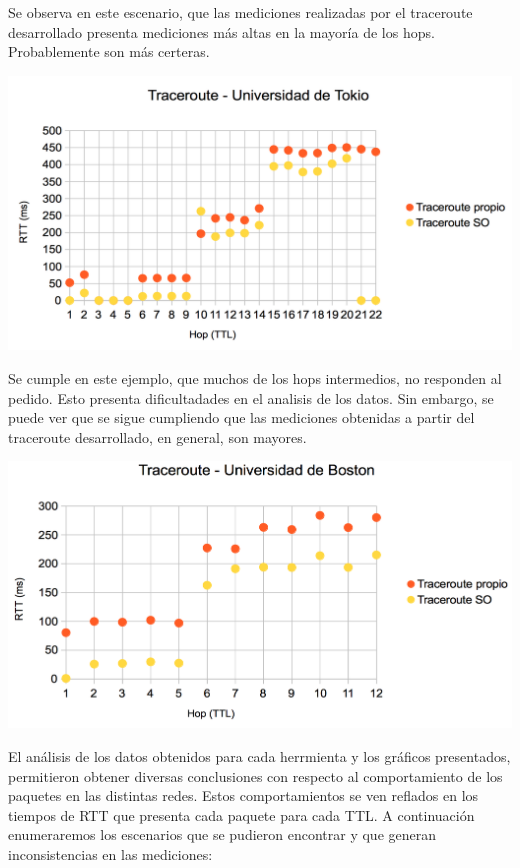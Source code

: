 Se observa en este escenario, que las mediciones realizadas por el traceroute desarrollado presenta mediciones más altas en la mayoría de los hops. Probablemente son más certeras. 

\centerline{\includegraphics[width=1\textwidth]{imagenes/1ra_parte/Japon_1ergrafico.png}}

Se cumple en este ejemplo, que muchos de los hops intermedios, no responden al pedido. Esto presenta dificultadades en el analisis de los datos. Sin embargo, se puede ver
que se sigue cumpliendo que las mediciones obtenidas a partir del traceroute desarrollado, en general, son mayores.

\centerline{\includegraphics[width=1\textwidth]{imagenes/1ra_parte/EEUU_1ergrafico.png}}

El análisis de los datos obtenidos para cada herrmienta y los gráficos presentados, permitieron obtener diversas conclusiones 
con respecto al comportamiento de los paquetes en las distintas redes. Estos comportamientos se ven reflados en los tiempos de RTT 
que presenta cada paquete para cada TTL. A continuación enumeraremos los escenarios que se pudieron encontrar y que generan inconsistencias en las mediciones:

